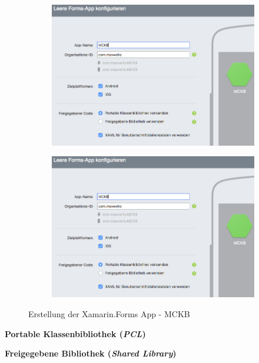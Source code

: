 	\begin{figure}[h!]
		\centering
		\begin{subfigure}
			\centering
			\includegraphics[width=.4\textwidth]{images/Project-Setup-one.png}
		\end{subfigure}
		\begin{subfigure}
			\centering
			\includegraphics[width=.4\textwidth]{images/Project-Setup-one.png}
		\end{subfigure}
		\caption{Erstellung der Xamarin.Forms App - MCKB}
		\label{fig:lol2}
	\end{figure}


	\textbf{Portable Klassenbibliothek (\textit{PCL})}

	\textbf{Freigegebene Bibliothek (\textit{Shared Library})}
























